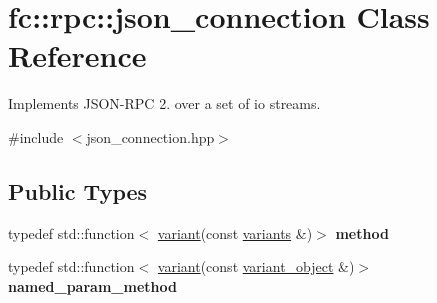\hypertarget{classfc_1_1rpc_1_1json__connection}{}\section{fc\+:\+:rpc\+:\+:json\+\_\+connection Class Reference}
\label{classfc_1_1rpc_1_1json__connection}


Implements J\+S\+O\+N-\/\+R\+PC 2. over a set of io streams.  




{\ttfamily \#include $<$json\+\_\+connection.\+hpp$>$}

\subsection*{Public Types}
\begin{DoxyCompactItemize}
\item 
\mbox{\label{classfc_1_1rpc_1_1json__connection_afd6482f82666d4fe0bb5a008d88c5a04}} 
typedef std\+::function$<$ \mbox{\hyperlink{classfc_1_1variant}{variant}}(const \mbox{\hyperlink{classstd_1_1vector}{variants}} \&)$>$ {\bfseries method}
\item 
\mbox{\label{classfc_1_1rpc_1_1json__connection_a9139913c8ad78f0e5c20830e8dd7e648}} 
typedef std\+::function$<$ \mbox{\hyperlink{classfc_1_1variant}{variant}}(const \mbox{\hyperlink{classfc_1_1variant__object}{variant\+\_\+object}} \&)$>$ {\bfseries named\+\_\+param\+\_\+method}
\end{DoxyCompactItemize}
